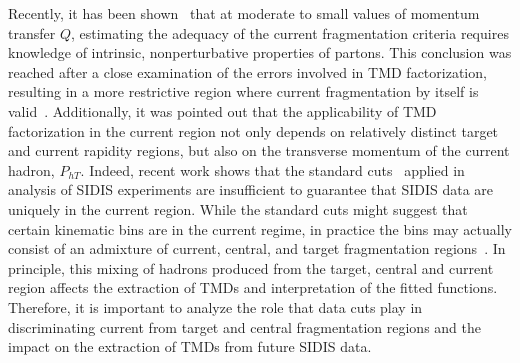\documentclass[final,3p,times,onecolumn,sort&compress,hidelinks]{elsarticle}
\newcommand{\cbl}{\color{blue}}
\begin{document}
Recently, it has been shown~\cite{Boglione:2016bph} that at moderate
to small values of momentum transfer $Q$, estimating the adequacy of
the current fragmentation criteria requires knowledge of intrinsic,
nonperturbative properties of partons.  This conclusion was reached
after a close examination of the errors involved in TMD factorization,
resulting in a more restrictive region where current fragmentation
by itself is valid~\cite{Boglione:2016bph}.
%
%
Additionally, it was pointed out that the applicability of TMD
factorization in the current region not only depends on relatively
distinct target and current rapidity regions, but also on the
transverse momentum of the current hadron, $P_{hT}$.
%
%
Indeed, recent work shows that the standard
cuts~\cite{Anselmino:2013lza, Bacchetta:2017gcc} applied in analysis
of SIDIS experiments are insufficient to guarantee that SIDIS data
are uniquely in the current region.  While the standard cuts might
suggest that certain kinematic bins are in the current regime,
in practice the bins may actually consist of an admixture of current, 
central, and target fragmentation regions~\cite{Boglione:2016bph}.
In principle, this mixing of hadrons produced from the target,
central and current region {\cbl affects} the extraction of TMDs
and interpretation of the fitted functions.  {\cbl Therefore, it is
important to analyze the role that data cuts play in discriminating
current from target and central fragmentation regions and the impact
on the extraction of TMDs from future SIDIS data.}
%


\end{document}
